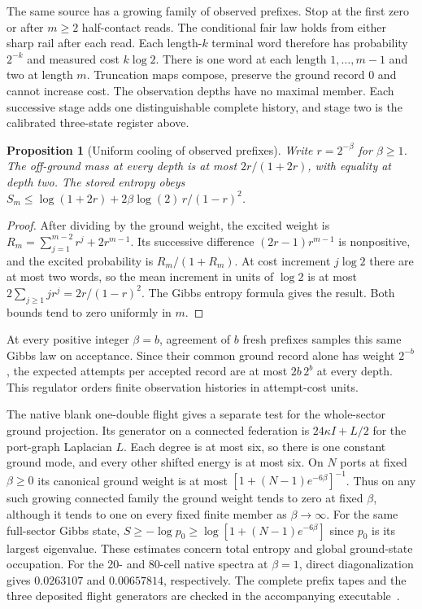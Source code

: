 \documentclass[11pt]{article}
\newtheorem{proposition}[theorem]{Proposition}
\begin{document}
The same source has a growing family of observed prefixes. Stop at the
first zero or after $m\ge2$ half-contact reads. The conditional fair law
holds from either sharp rail after each read. Each length-$k$ terminal
word therefore has probability $2^{-k}$ and measured cost $k\log 2$.
There is one word at each length $1,\ldots,m-1$ and two at length $m$.
Truncation maps compose, preserve the ground record $0$ and cannot
increase cost. The observation depths have no maximal member. Each
successive stage adds one distinguishable complete history, and stage
two is the calibrated three-state register above.

\begin{proposition}[Uniform cooling of observed prefixes]
Write $r=2^{-\beta}$ for $\beta\ge1$. The off-ground mass at every depth
is at most $2r/(1+2r)$, with equality at depth two. The stored entropy
obeys $S_m\le\log(1+2r)+2\beta\log(2)\,r/(1-r)^2$.
\end{proposition}
\begin{proof}
After dividing by the ground weight, the excited weight is
$R_m=\sum_{j=1}^{m-2}r^j+2r^{m-1}$. Its successive difference
$(2r-1)r^{m-1}$ is nonpositive, and the excited probability is
$R_m/(1+R_m)$. At cost increment $j\log2$ there are at most two
words, so the mean increment in units of $\log2$ is at most
$2\sum_{j\ge1}jr^j=2r/(1-r)^2$. The Gibbs entropy formula gives
the result. Both bounds tend to zero uniformly in $m$.
\end{proof}
At every positive integer $\beta=b$, agreement of $b$ fresh prefixes
samples this same Gibbs law on acceptance. Since their common ground
record alone has weight $2^{-b}$, the expected attempts per accepted
record are at most $2b\,2^b$ at every depth. This regulator orders
finite observation histories in attempt-cost units.

The native blank one-double flight gives a separate test for the
whole-sector ground projection. Its generator on a connected federation
is $24\kappa I+L/2$ for the port-graph Laplacian $L$. Each degree is at
most six, so there is one constant ground mode, and every other shifted
energy is at most six. On $N$ ports at fixed $\beta\ge0$ its canonical
ground weight is at most $[1+(N-1)e^{-6\beta}]^{-1}$. Thus on any such
growing connected family the ground weight tends to zero at fixed
$\beta$, although it tends to one on every fixed finite member as
$\beta\to\infty$. For the same full-sector Gibbs state,
$S\ge-\log p_0\ge\log[1+(N-1)e^{-6\beta}]$ since $p_0$ is its
largest eigenvalue. These estimates concern total entropy and global
ground-state occupation. For the 20- and 80-cell native spectra at $\beta=1$, direct
diagonalization gives $0.0263107$ and $0.00657814$, respectively.
The complete prefix tapes and the three deposited flight generators
are checked in the accompanying executable~\cite{ophrepo}.
\end{document}
